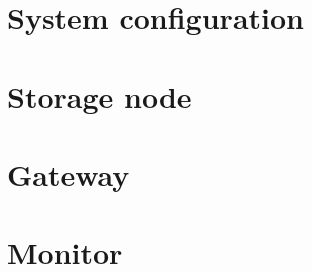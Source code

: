 \section{System configuration} \label{sec:configuration}

\section{Storage node} \label{sec:storage}

\section{Gateway} \label{sec:gateway}

\section{Monitor} \label{sec:monitor}